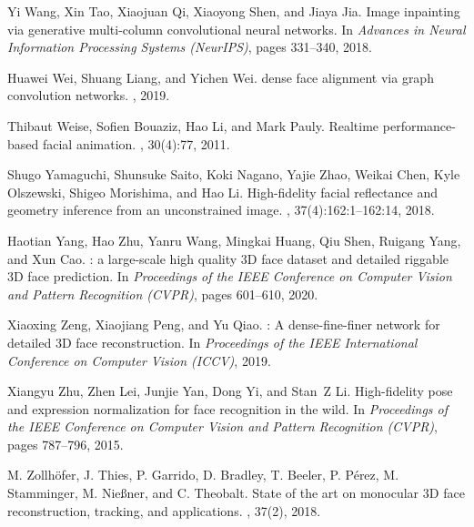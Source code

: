 \documentclass[final]{cvpr}
\begin{document}
{\begin{thebibliography}{10}
Yi Wang, Xin Tao, Xiaojuan Qi, Xiaoyong Shen, and Jiaya Jia.
\newblock Image inpainting via generative multi-column convolutional neural
  networks.
\newblock In {\em Advances in Neural Information Processing Systems (NeurIPS)},
  pages 331--340, 2018.

Huawei Wei, Shuang Liang, and Yichen Wei.
 dense face alignment via graph convolution networks.
, 2019.

Thibaut Weise, Sofien Bouaziz, Hao Li, and Mark Pauly.
\newblock Realtime performance-based facial animation.
, 30(4):77, 2011.

Shugo Yamaguchi, Shunsuke Saito, Koki Nagano, Yajie Zhao, Weikai Chen, Kyle
  Olszewski, Shigeo Morishima, and Hao Li.
\newblock High-fidelity facial reflectance and geometry inference from an
  unconstrained image.
, 37(4):162:1--162:14, 2018.

Haotian Yang, Hao Zhu, Yanru Wang, Mingkai Huang, Qiu Shen, Ruigang Yang, and
  Xun Cao.
: a large-scale high quality {3D} face dataset and
  detailed riggable {3D} face prediction.
\newblock In {\em Proceedings of the IEEE Conference on Computer Vision and
  Pattern Recognition (CVPR)}, pages 601--610, 2020.

Xiaoxing Zeng, Xiaojiang Peng, and Yu Qiao.
: A dense-fine-finer network for detailed {3D} face
  reconstruction.
\newblock In {\em Proceedings of the IEEE International Conference on Computer
  Vision (ICCV)}, 2019.

Xiangyu Zhu, Zhen Lei, Junjie Yan, Dong Yi, and Stan~Z Li.
\newblock High-fidelity pose and expression normalization for face recognition
  in the wild.
\newblock In {\em Proceedings of the IEEE Conference on Computer Vision and
  Pattern Recognition (CVPR)}, pages 787--796, 2015.

M. {Zollh{\"o}fer}, J. {Thies}, P. {Garrido}, D. {Bradley}, T. {Beeler}, P.
  P{\'e}rez, M. {Stamminger}, M. Nie{\ss}ner, and C. {Theobalt}.
\newblock State of the art on monocular {3D} face reconstruction, tracking, and
  applications.
, 37(2), 2018.

\end{thebibliography}
 \balance
}
\end{document}
